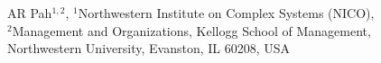 AR Pah$^{1,2}$, 
\normalsize{$^1$Northwestern Institute on Complex Systems (NICO),}\\
\normalsize{$^2$Management and Organizations, Kellogg School of Management,}\\
\normalsize{Northwestern University, Evanston, IL 60208, USA}\\
